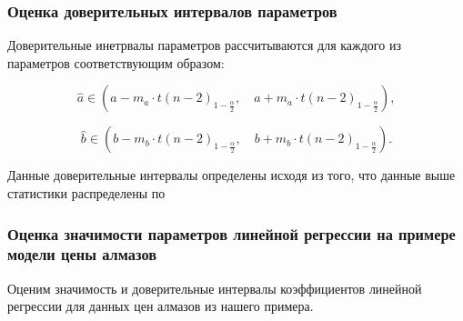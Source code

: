 \documentclass[
]{article}
\begin{document}
\hypertarget{ux43eux446ux435ux43dux43aux430-ux434ux43eux432ux435ux440ux438ux442ux435ux43bux44cux43dux44bux445-ux438ux43dux442ux435ux440ux432ux430ux43bux43eux432-ux43fux430ux440ux430ux43cux435ux442ux440ux43eux432}{%
\subsubsection{\texorpdfstring{\textbf{Оценка доверительных интервалов
параметров}}{Оценка доверительных интервалов параметров}}\label{ux43eux446ux435ux43dux43aux430-ux434ux43eux432ux435ux440ux438ux442ux435ux43bux44cux43dux44bux445-ux438ux43dux442ux435ux440ux432ux430ux43bux43eux432-ux43fux430ux440ux430ux43cux435ux442ux440ux43eux432}}

Доверительные инетрвалы параметров рассчитываются для каждого из
параметров соответствующим образом:

\[
\hat{a} \in \left(a - m_a \cdot t(n-2)_{1 - \frac{\alpha}{2}}, \quad a + m_a \cdot t(n-2)_{1 - \frac{\alpha}{2}} \right),
\]

\[
\hat{b} \in \left(b - m_b \cdot t(n-2)_{1 - \frac{\alpha}{2}}, \quad b + m_b \cdot t(n-2)_{1 - \frac{\alpha}{2}} \right).
\]

Данные доверительные интервалы определены исходя из того, что данные
выше статистики распределены по

\hypertarget{ux43eux446ux435ux43dux43aux430-ux437ux43dux430ux447ux438ux43cux43eux441ux442ux438-ux43fux430ux440ux430ux43cux435ux442ux440ux43eux432-ux43bux438ux43dux435ux439ux43dux43eux439-ux440ux435ux433ux440ux435ux441ux441ux438ux438-ux43dux430-ux43fux440ux438ux43cux435ux440ux435-ux43cux43eux434ux435ux43bux438-ux446ux435ux43dux44b-ux430ux43bux43cux430ux437ux43eux432}{%
\subsubsection{\texorpdfstring{\textbf{Оценка значимости параметров
линейной регрессии на примере модели цены
алмазов}}{Оценка значимости параметров линейной регрессии на примере модели цены алмазов}}\label{ux43eux446ux435ux43dux43aux430-ux437ux43dux430ux447ux438ux43cux43eux441ux442ux438-ux43fux430ux440ux430ux43cux435ux442ux440ux43eux432-ux43bux438ux43dux435ux439ux43dux43eux439-ux440ux435ux433ux440ux435ux441ux441ux438ux438-ux43dux430-ux43fux440ux438ux43cux435ux440ux435-ux43cux43eux434ux435ux43bux438-ux446ux435ux43dux44b-ux430ux43bux43cux430ux437ux43eux432}}

Оценим значимость и доверительные интервалы коэффициентов линейной
регрессии для данных цен алмазов из нашего примера.
\end{document}
